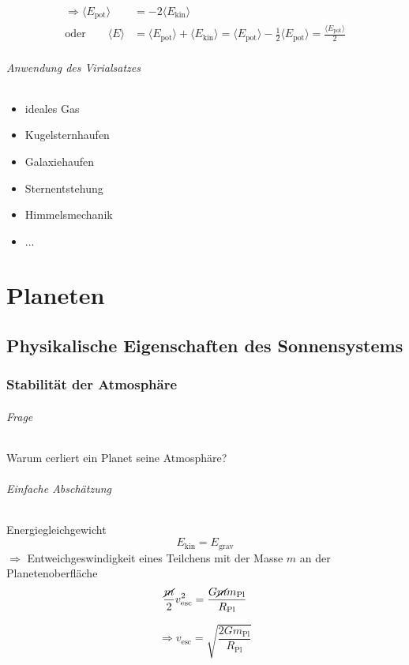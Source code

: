 \begin{align*}
    \Rightarrow \langle E_{\mathrm{pot}}\rangle &= -2 \langle E_{\mathrm{kin}} \rangle \\
    \text{oder}\qquad \langle E\rangle &= \langle E_{\mathrm{pot}} \rangle + \langle E_{\mathrm{kin}} \rangle = 
    \langle E_{\mathrm{pot}} \rangle - \frac{1}{2} \langle E_{\mathrm{pot}} \rangle = \frac{\langle E_{\mathrm{pot}} \rangle}{2}
\end{align*}

\paragraph{Anwendung des Virialsatzes}
\begin{itemize}
    \item ideales Gas
    \item Kugelsternhaufen
    \item Galaxiehaufen
    \item Sternentstehung
    \item Himmelsmechanik
    \item ...
\end{itemize}

\part{Planeten}
\chapter{Physikalische Eigenschaften des Sonnensystems}
\section{Stabilität der Atmosphäre}
\paragraph{Frage} Warum cerliert ein Planet seine Atmosphäre?
\paragraph{Einfache Abschätzung} Energiegleichgewicht
\[ E_{\mathrm{kin}} = E_{\mathrm{grav}} \]
$\Rightarrow$ Entweichgeswindigkeit eines Teilchens mit der Masse $m$ an der 
              Planetenoberfläche
\[ \frac{\cancel{m}}{2} v_{\mathrm{esc}}^2 = \frac{G \cancel{m} m_{\mathrm{Pl}}}{R_{\mathrm{Pl}}} \]

\[ \Rightarrow v_{\mathrm{esc}} = \sqrt{\frac{2 G m_{\mathrm{Pl}}}{R_{\mathrm{Pl}}}} \]

